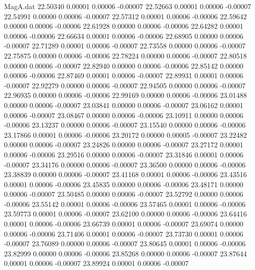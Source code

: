 \begin{filecontents}{MagA.dat}
  22.50340    0.00001    0.00006   -0.00007
  22.52663    0.00001    0.00006   -0.00007
  22.54991    0.00000    0.00006   -0.00007
  22.57312    0.00001    0.00006   -0.00006
  22.59642    0.00000    0.00006   -0.00006
  22.61928    0.00000    0.00006   -0.00006
  22.64282    0.00001    0.00006   -0.00006
  22.66634    0.00001    0.00006   -0.00006
  22.68905    0.00000    0.00006   -0.00007
  22.71289    0.00001    0.00006   -0.00007
  22.73558    0.00000    0.00006   -0.00007
  22.75875    0.00000    0.00006   -0.00006
  22.78224    0.00000    0.00006   -0.00007
  22.80518    0.00000    0.00006   -0.00007
  22.82940    0.00000    0.00006   -0.00006
  22.85142    0.00000    0.00006   -0.00006
  22.87469    0.00001    0.00006   -0.00007
  22.89931    0.00001    0.00006   -0.00007
  22.92279    0.00000    0.00006   -0.00007
  22.94505    0.00000    0.00006   -0.00007
  22.96935    0.00000    0.00006   -0.00006
  22.99169    0.00000    0.00006   -0.00006
  23.01488    0.00000    0.00006   -0.00007
  23.03841    0.00000    0.00006   -0.00007
  23.06162    0.00001    0.00006   -0.00007
  23.08467    0.00000    0.00006   -0.00006
  23.10911    0.00000    0.00006   -0.00006
  23.13237    0.00000    0.00006   -0.00007
  23.15540    0.00000    0.00006   -0.00006
  23.17866    0.00001    0.00006   -0.00006
  23.20172    0.00000    0.00005   -0.00007
  23.22482    0.00000    0.00006   -0.00007
  23.24826    0.00000    0.00006   -0.00007
  23.27172    0.00001    0.00006   -0.00006
  23.29516    0.00000    0.00006   -0.00007
  23.31846    0.00001    0.00006   -0.00007
  23.34176    0.00000    0.00006   -0.00007
  23.36500    0.00000    0.00006   -0.00006
  23.38839    0.00000    0.00006   -0.00007
  23.41168    0.00001    0.00006   -0.00006
  23.43516    0.00001    0.00006   -0.00006
  23.45835    0.00000    0.00006   -0.00006
  23.48171    0.00000    0.00006   -0.00007
  23.50485    0.00000    0.00006   -0.00007
  23.52792    0.00000    0.00006   -0.00006
  23.55142    0.00001    0.00006   -0.00006
  23.57465    0.00001    0.00006   -0.00006
  23.59773    0.00001    0.00006   -0.00007
  23.62100    0.00000    0.00006   -0.00006
  23.64416    0.00001    0.00006   -0.00006
  23.66739    0.00001    0.00006   -0.00007
  23.69074    0.00000    0.00006   -0.00006
  23.71406    0.00001    0.00006   -0.00007
  23.73730    0.00001    0.00006   -0.00007
  23.76089    0.00000    0.00006   -0.00007
  23.80645    0.00001    0.00006   -0.00006
  23.82999    0.00000    0.00006   -0.00006
  23.85268    0.00000    0.00006   -0.00007
  23.87644    0.00001    0.00006   -0.00007
  23.89924    0.00001    0.00006   -0.00007

\end{filecontents}
